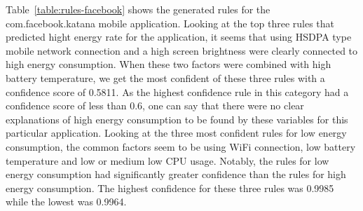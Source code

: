 Table~\ref{table:rules-facebook} shows the generated rules for the com.facebook.katana mobile application. Looking at the top three rules that predicted hight energy rate for the application, it seems that using HSDPA type mobile network connection and a high screen brightness were clearly connected to high energy consumption. When these two factors were combined with high battery temperature, we get the most confident of these three rules with a confidence score of 0.5811. As the highest confidence rule in this category had a confidence score of less than 0.6, one can say that there were no clear explanations of high energy consumption to be found by these variables for this particular application. Looking at the three most confident rules for low energy consumption, the common factors seem to be using WiFi connection, low battery temperature and low or medium low CPU usage. Notably, the rules for low energy consumption had significantly greater confidence than the rules for high energy consumption. The highest confidence for these three rules was 0.9985 while the lowest was 0.9964. 

